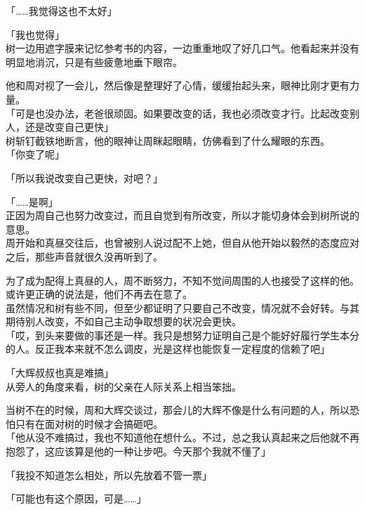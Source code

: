 「……我觉得这也不太好」

「我也觉得」\\

树一边用遮字膜来记忆参考书的内容，一边重重地叹了好几口气。他看起来并没有明显地消沉，只是有些疲惫地垂下眼帘。

他和周对视了一会儿，然后像是整理好了心情，缓缓抬起头来，眼神比刚才更有力量。\\

「可是也没办法，老爸很顽固。如果要改变的话，我也必须改变才行。比起改变别人，还是改变自己更快」\\

树斩钉截铁地断言，他的眼神让周眯起眼睛，仿佛看到了什么耀眼的东西。\\

「你变了呢」

「所以我说改变自己更快，对吧？」

「……是啊」\\

正因为周自己也努力改变过，而且自觉到有所改变，所以才能切身体会到树所说的意思。\\

周开始和真昼交往后，也曾被别人说过配不上她，但自从他开始以毅然的态度应对之后，那些声音就很久没再听到了。

为了成为配得上真昼的人，周不断努力，不知不觉间周围的人也接受了这样的他。或许更正确的说法是，他们不再去在意了。\\

虽然情况和树有些不同，但至少都证明了只要自己不改变，情况就不会好转。与其期待别人改变，不如自己主动争取想要的状况会更快。\\

「哎，到头来要做的事还是一样。我只是想努力证明自己是个能好好履行学生本分的人。反正我本来就不怎么调皮，光是这样也能恢复一定程度的信赖了吧」

「大辉叔叔也真是难搞」\\

从旁人的角度来看，树的父亲在人际关系上相当笨拙。

当树不在的时候，周和大辉交谈过，那会儿的大辉不像是什么有问题的人，所以恐怕只有在面对树的时候才会搞砸吧。\\

「他从没不难搞过，我也不知道他在想什么。不过，总之我认真起来之后他就不再抱怨了，这应该算是他的一种让步吧。今天那个我就不懂了」

「我投不知道怎么相处，所以先放着不管一票」

「可能也有这个原因，可是……」

